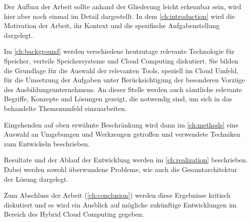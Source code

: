 Der Aufbau der Arbeit sollte anhand der Gliederung leicht erkennbar sein, wird hier aber noch einmal im Detail dargestellt. In dem \autoref{ch:introduction} wird die Motivation der Arbeit, ihr Kontext und die spezifische Aufgabenstellung dargelegt.

Im \autoref{ch:background} werden verschiedene heutzutage relevante Technologie für Speicher, verteile Speichersysteme und Cloud Computing diskutiert. Sie bilden die Grundlage für die Auswahl der relevanten Tools, speziell im Cloud Umfeld, für die Umsetzung der Aufgaben unter Berücksichtigung der besonderen Vorzüge des Ausbildungsunternehmens.
An dieser Stelle werden auch sämtliche relevante Begriffe, Konzepte und Lösungen gezeigt, die notwendig sind, um sich in das behandelte Themenumfeld einzuarbeiten.

Eingehenden auf oben erwähnte Beschränkung wird dann im \autoref{ch:methods} eine Auswahl an Umgebungen und Werkzeugen getroffen und verwendete Techniken zum Entwickeln beschrieben.

Resultate und der Ablauf der Entwicklung werden im \autoref{ch:realization} beschrieben. Dabei werden sowohl überwundene Probleme, wie auch die Gesamtarchitektur der Lösung dargelegt.

Zum Abschluss der Arbeit (\autoref{ch:conclusion}) werden diese Ergebnisse kritisch diskutiert und es wird ein Ausblick auf mögliche zukünftige Entwicklungen im Bereich des Hybrid Cloud Computing gegeben.